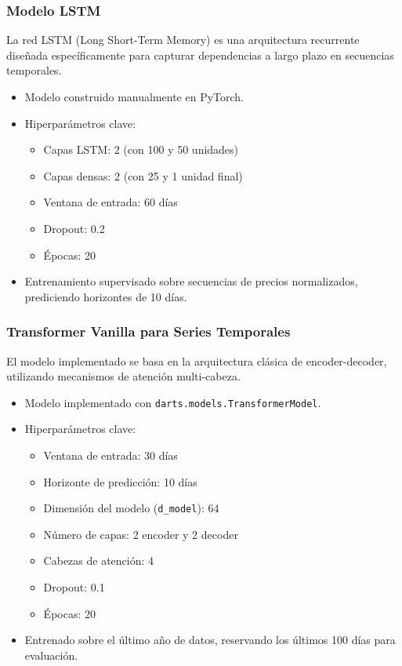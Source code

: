 \documentclass[12pt]{article}
\begin{document}
\subsubsection{Modelo LSTM}

La red LSTM (Long Short-Term Memory) es una arquitectura recurrente diseñada específicamente para capturar dependencias a largo plazo en secuencias
temporales.

\begin{itemize}
\item Modelo construido manualmente en PyTorch.
\item Hiperparámetros clave:
\begin{itemize}
\item Capas LSTM: 2 (con 100 y 50 unidades)
\item Capas densas: 2 (con 25 y 1 unidad final)
\item Ventana de entrada: 60 días  %
\item Dropout: 0.2
\item Épocas: 20
\end{itemize}
\item Entrenamiento supervisado sobre secuencias de precios normalizados, prediciendo horizontes de 10 días.
\end{itemize}

\subsubsection{Transformer Vanilla para Series Temporales}

El modelo implementado se basa en la arquitectura clásica de encoder-decoder, utilizando mecanismos de atención multi-cabeza.

\begin{itemize}
\item Modelo implementado con \texttt{darts.models.TransformerModel}.
\item Hiperparámetros clave:
\begin{itemize}
\item Ventana de entrada: 30 días
\item Horizonte de predicción: 10 días
\item Dimensión del modelo (\texttt{d\_model}): 64
\item Número de capas: 2 encoder y 2 decoder
\item Cabezas de atención: 4
\item Dropout: 0.1
\item Épocas: 20
\end{itemize}
\item Entrenado sobre el último año de datos, reservando los últimos 100 días para evaluación.
\end{itemize}
\end{document}

